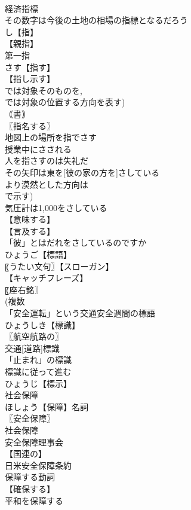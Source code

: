 \documentclass[8pt]{extreport}
\begin{document}
\begin{CJK}{UTF8}{min}
\\	経済指標
\\	その数字は今後の土地の相場の指標となるだろう
\\	し【指】
\\	【親指】
\\	第一指
\\	さす【指す】
\\	【指し示す】
\\	では対象そのものを, 
\\	では対象の位置する方向を表す) 
\\	｟書｠
\\	〖指名する〗
\\	地図上の場所を指でさす
\\	授業中にさされる
\\	人を指さすのは失礼だ
\\	その矢印は東を[彼の家の方を]さしている
\\	より漠然とした方向は 
\\	で示す)
\\	気圧計は1,000をさしている
\\	【意味する】
\\	【言及する】
\\	「彼」とはだれをさしているのですか
\\	ひょうご【標語】
\\	〖うたい文句〗【スローガン】
\\	【キャッチフレーズ】
\\	〖座右銘〗
\\	(複数 
\\	「安全運転」という交通安全週間の標語
\\	ひょうしき【標識】
\\	〖航空航路の〗
\\	交通[道路]標識
\\	「止まれ」の標識
\\	標識に従って進む
\\	ひょうじ【標示】
\\	社会保障		
\\	ほしょう【保障】名詞
\\	〖安全保障〗
\\	社会保障
\\	安全保障理事会
\\	【国連の】
\\	日米安全保障条約
\\	保障する動詞
\\	【確保する】
\\	平和を保障する

\end{CJK}
\end{document}
